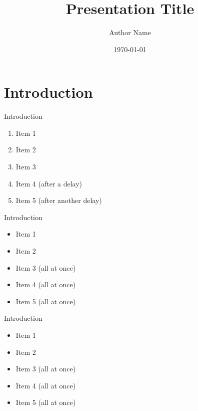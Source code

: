 \documentclass{beamer}
\title{Presentation Title}
\author{Author Name}
\institute{Author Institution}
\date{\today}
\begin{document}
\begin{frame}

\titlepage

\end{frame}

\section[Intro]{Introduction} %

\begin{frame}{Introduction}

\begin{enumerate}
	\item Item 1
	\item Item 2
	\item Item 3
	\item<2-> Item 4 (after a delay)
	\item<3-> Item 5 (after another delay)
\end{enumerate}

\end{frame}

\begin{frame}{Introduction}

\begin{itemize}
	\item Item 1
	\item Item 2
	\item<2-> Item 3 (all at once)
	\item<2-> Item 4 (all at once)
	\item<2-> Item 5 (all at once)
\end{itemize}

\end{frame}

\begin{frame}{Introduction}

\begin{itemize}
	\item Item 1
	\item Item 2 \pause
	\item Item 3 (all at once)
	\item Item 4 (all at once)
	\item Item 5 (all at once)
\end{itemize}

\end{frame}
\end{document}

